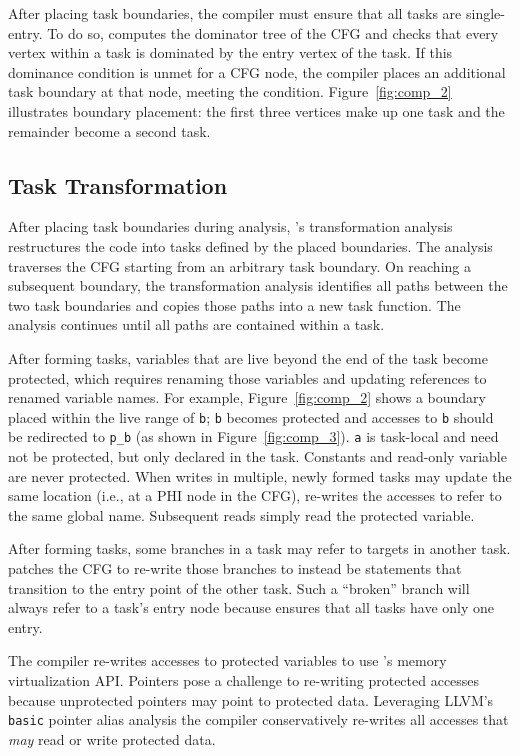 After placing task boundaries, the compiler must ensure that all tasks are single-entry. To do so, \sys computes the dominator tree of the CFG and checks that every vertex within a task is dominated by the entry vertex of the task. If this dominance condition is unmet for a CFG node, the compiler places an additional task boundary at that node, meeting the condition. Figure~\ref{fig:comp_2} illustrates boundary placement: the first three vertices make up one task and the remainder become a second task.

\subsection{Task Transformation}
\label{sec:compiler_transform_pass}

After placing task boundaries during analysis, \sys's transformation analysis restructures the code into tasks defined by the placed boundaries. The analysis traverses the CFG starting from an arbitrary task boundary. On reaching a subsequent boundary, the transformation analysis identifies all paths between the two task boundaries and copies those paths into a new task function. The analysis continues until all paths are contained within a task. 

After forming tasks, variables that are live beyond the end of the task become protected, which requires renaming those variables and updating references to renamed variable names. For example, Figure~\ref{fig:comp_2} shows a boundary placed within the live range of {\tt b}; {\tt b} becomes protected and accesses to {\tt b} should be redirected to {\tt p\_b} (as shown in Figure~\ref{fig:comp_3}). {\tt a} is task-local and need not be protected, but only declared in the task. Constants and read-only variable are never protected. When writes in multiple, newly formed tasks may update the same location (i.e., at a PHI node in the CFG), \sys re-writes the accesses to refer to the same global name. Subsequent reads simply read the protected variable.

After forming tasks, some branches in a task may refer to targets in another task. \sys patches the CFG to re-write those branches to instead be \transition statements that transition to the entry point of the other task. Such a ``broken'' branch will always refer to a task's entry node because \sys ensures that all tasks have only one entry. 

The compiler re-writes accesses to protected variables to use \sys's memory virtualization API. Pointers pose a challenge to re-writing protected accesses because unprotected pointers may point to protected data. Leveraging LLVM's {\tt basic} pointer alias analysis the compiler conservatively re-writes all accesses that {\em may} read or write protected data. 


